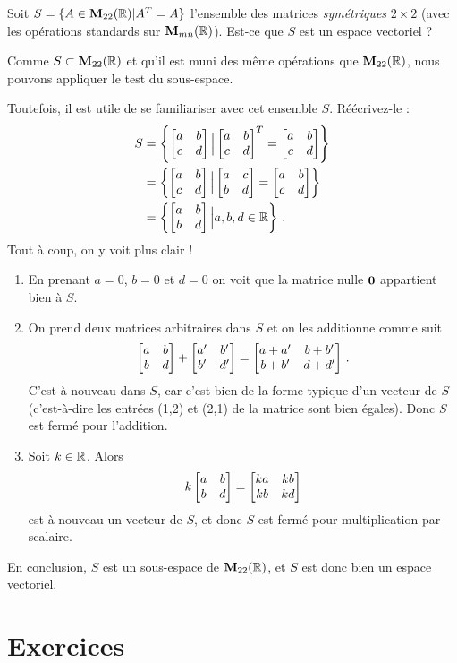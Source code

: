 \begin{myprob}
Soit $S = \{ A \in \mathbf{M}_{22}(\mathbb{R}) | A^T = A\}$ l'ensemble
des matrices \emph{symétriques} $2 \times 2$ (avec les opérations
standards sur $\mathbf{M}_{mn}(\mathbb{R})$). Est-ce que $S$ est un espace vectoriel ?

\begin{mysol}
Comme $S \subset \mathbf{M}_{22}(\mathbb{R})$ et qu'il est muni des même opérations que $\mathbf{M}_{22}(\mathbb{R})$, 
nous pouvons appliquer le test du sous-espace.

Toutefois, il est utile de se familiariser avec cet ensemble $S$.
Réécrivez-le : \[\begin{aligned}
S &= \left\{ \left[ \begin{matrix} a&b\\c&d \end{matrix} \right] \Big|  \left[ \begin{matrix} a&b\\c&d \end{matrix} \right]^T = \left[ \begin{matrix} a&b\\c&d \end{matrix} \right]\right\}\\
&= \left\{ \left[ \begin{matrix} a&b\\c&d \end{matrix} \right] \Big|  \left[ \begin{matrix} a&c\\b&d \end{matrix} \right] = \left[ \begin{matrix} a&b\\c&d \end{matrix} \right]\right\}\\
&= \left\{ \left[ \begin{matrix} a&b\\b&d \end{matrix} \right] \Big| a,b,d \in \mathbb{R}\right\}\,.\end{aligned}\] 
Tout à coup, on y voit plus clair !

\begin{enumerate}
\item
  En prenant $a=0$, $b=0$ et $d=0$ on voit que la matrice nulle $\mathbf{0}$ appartient bien \`a $S$.
\item
  On prend deux matrices arbitraires dans $S$ et on les additionne comme suit
  \[\left[ \begin{matrix} a&b\\b&d \end{matrix} \right] + \left[ \begin{matrix} a'&b' \\ b'&d' \end{matrix} \right] = \left[ \begin{matrix} a+a' & b+b' \\ b+b' & d+d' \end{matrix} \right]\,.\]
  C'est à nouveau dans $S$, car c'est bien de la forme typique d'un vecteur de $S$ (c'est-à-dire les entrées (1,2) et (2,1) de la matrice sont bien
  égales). Donc $S$ est fermé pour l'addition.
\item
  Soit $k\in \mathbb{R}$. Alors
  \[k\left[ \begin{matrix} a&b\\b&d \end{matrix} \right] = \left[ \begin{matrix} ka & kb \\ kb& kd \end{matrix} \right]\] est à nouveau un vecteur de
  $S$, et donc $S$ est fermé pour multiplication par scalaire.
\end{enumerate}

En conclusion, $S$ est un sous-espace de $\mathbf{M}_{22}(\mathbb{R})$, et $S$ est donc bien un espace vectoriel.

\end{mysol}
\end{myprob}


\section*{Exercices}
